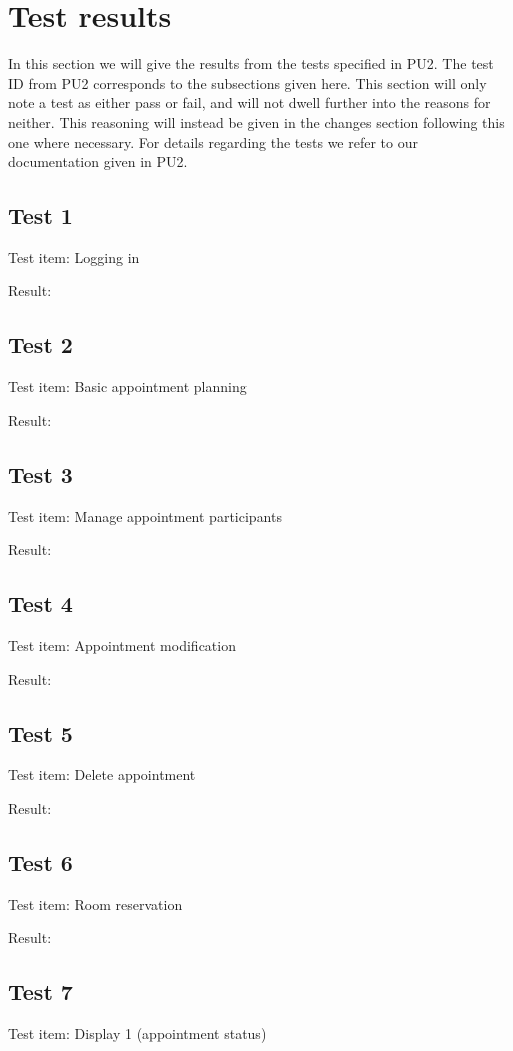 \section{Test results}
In this section we will give the results from the tests specified in PU2. The test ID from PU2 corresponds to the subsections given here. This section will only note a test as either pass or fail, and will not dwell further into the reasons for neither. This reasoning will instead be given in the changes section following this one where necessary. For details regarding the tests we refer to our documentation given in PU2.
\subsection{Test 1}
Test item: Logging in

Result:

\subsection{Test 2}
Test item: Basic appointment planning

Result:

\subsection{Test 3}
Test item: Manage appointment participants

Result:

\subsection{Test 4}
Test item: Appointment modification

Result:

\subsection{Test 5}
Test item: Delete appointment

Result:

\subsection{Test 6}
Test item: Room reservation

Result:

\subsection{Test 7}
Test item: Display 1 (appointment status)

